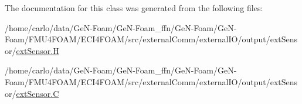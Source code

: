 The documentation for this class was generated from the following files\+:\begin{DoxyCompactItemize}
\item 
/home/carlo/data/\+Ge\+N-\/\+Foam/\+Ge\+N-\/\+Foam\+\_\+ffn/\+Ge\+N-\/\+Foam/\+Ge\+N-\/\+Foam/\+F\+M\+U4\+F\+O\+A\+M/\+E\+C\+I4\+F\+O\+A\+M/src/external\+Comm/external\+I\+O/output/ext\+Sensor/\hyperlink{extSensor_8H}{ext\+Sensor.\+H}\item 
/home/carlo/data/\+Ge\+N-\/\+Foam/\+Ge\+N-\/\+Foam\+\_\+ffn/\+Ge\+N-\/\+Foam/\+Ge\+N-\/\+Foam/\+F\+M\+U4\+F\+O\+A\+M/\+E\+C\+I4\+F\+O\+A\+M/src/external\+Comm/external\+I\+O/output/ext\+Sensor/\hyperlink{extSensor_8C}{ext\+Sensor.\+C}\end{DoxyCompactItemize}
